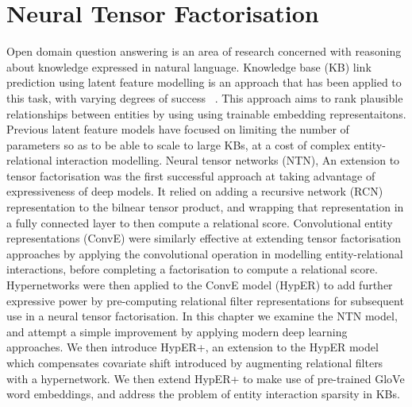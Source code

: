 \chapter{Neural Tensor Factorisation}


\ifpdf
    \graphicspath{{Chapter3/Figs/Raster/}{Chapter3/Figs/PDF/}{Chapter3/Figs/}}
\else
    \graphicspath{{Chapter3/Figs/Vector/}{Chapter3/Figs/}}
\fi


Open domain question answering is an area of research concerned with reasoning about knowledge expressed in natural language. Knowledge base (KB) link prediction using latent feature modelling is an approach that has been applied to this task, with varying degrees of success  ~\citep{nguyen2017novel, diefenbach2018wdaqua, kristiadi2019incorporating}. This approach aims to rank plausible relationships between entities by using using trainable embedding representaitons. Previous latent feature models have focused on limiting the number of parameters so as to be able to scale to large KBs, at a cost of complex entity-relational interaction modelling. \newline
Neural tensor networks (NTN), An extension to tensor factorisation was the first successful approach at taking advantage of expressiveness of deep models. It relied on adding a recursive network (RCN) representation to the bilnear tensor product, and wrapping that representation in a fully connected layer to then compute a relational score. Convolutional entity representations (ConvE) were similarly effective at extending tensor factorisation approaches by applying the convolutional operation in modelling entity-relational interactions, before completing a factorisation to compute a relational score. Hypernetworks were then applied to the ConvE model (HypER) to add further expressive power by pre-computing relational filter representations for subsequent use in a neural tensor factorisation. \newline
In this chapter we examine the NTN model, and attempt a simple improvement by applying modern deep learning approaches. We then introduce HypER+, an extension to the HypER model which compensates covariate shift introduced by augmenting relational filters with a hypernetwork. We then extend HypER+ to make use of pre-trained GloVe word embeddings, and address the problem of entity interaction sparsity in KBs.


